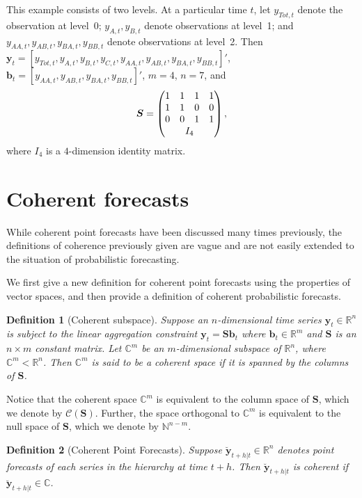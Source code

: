 \documentclass[a4paper, 11pt]{article}
\newtheorem{definition}{Definition}[section]
\begin{document}
This example consists of two levels. At a particular time $t$, let $y_{Tot,t}$ denote the observation at level~0; $y_{A,t}, y_{B,t} $ denote observations at level~1; and $y_{AA,t}, y_{AB,t}, y_{BA,t}, y_{BB,t}$ denote observations at level~2. Then $\bm{y}_t = [y_{Tot,t},y_{A,t}, y_{B,t},y_{C,t},y_{AA,t}, y_{AB,t}, y_{BA,t}, y_{BB,t}]'$, $\bm{b}_t = [y_{AA,t}, y_{AB,t}, y_{BA,t}, y_{BB,t}]'$, $m=4$, $n=7$, and 
$$ 
  \bm{S} = \begin{pmatrix} 
               1& 1 &1 &1  \\ 
               1 &1 & 0 &0 \\   
               0&0  & 1 & 1 \\ 
               & \multicolumn{2}{c}{I_4} &   
           \end{pmatrix}, 
$$ 
where $I_4$ is a $4$-dimension identity matrix.  


\section{Coherent forecasts}\label{sec:definitions}

While coherent point forecasts have been discussed many times previously, the definitions of coherence previously given are vague and are not easily extended to the situation of probabilistic forecasting.

We first give a new definition for coherent point forecasts using the properties of vector spaces, and then provide a definition of coherent probabilistic forecasts. 

\begin{definition}[Coherent subspace]
Suppose an $n$-dimensional time series $\bm{y}_t \in \mathbb{R}^n$ is subject to the linear aggregation constraint $\bm{y}_t = \bm{S}\bm{b}_t$ where $\bm{b}_t \in \mathbb{R}^m$ and $\bm{S}$ is an $n \times m$ constant matrix. Let $\mathbb{C}^m$ be an $m$-dimensional subspace of $\mathbb{R}^n$, where $\mathbb{C}^m < \mathbb{R}^n$. Then $\mathbb{C}^m$ is said to be a coherent space if it is spanned by the columns of $\bm{S}$. 
\end{definition}

Notice that the coherent space $\mathbb{C}^m$ is equivalent to the column space of $\bm{S}$, which we denote by $\mathscr{C}(\bm{S})$. Further, the space orthogonal to $\mathbb{C}^m$ is equivalent to the null space of $\bm{S}$, which we denote by $\bm{\mathbb{N}}^{n-m}$.

\begin{definition}[Coherent Point Forecasts]\label{def:cohpoint}
  Suppose $\breve{\bm{y}}_{t+h|t} \in \mathbb{R}^n$ denotes point forecasts of each series in the hierarchy at time $t+h$.  Then $\breve{\bm{y}}_{t+h|t}$ is \emph{coherent} if $\breve{\bm{y}}_{t+h|t} \in \mathbb{C}$. 
\end{definition}
\end{document}
